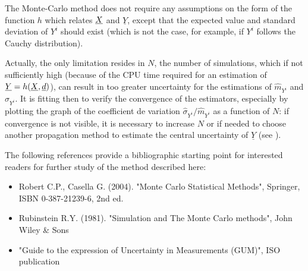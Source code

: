{
  The Monte-Carlo method does not require any assumptions on the form of the function $h$ which relates ${\underline{X}}$ and $\underline{Y}$, except that the expected value and standard deviation of $Y^i$ should exist (which is not the case, for example, if $Y^i$ follows the Cauchy distribution).

  Actually, the only limitation resides in $N$, the number of simulations, which if not sufficiently high (because of the CPU time required for an estimation of $\underline{Y}=h({\underline{X}},{\underline{d}})$), can result in too greater uncertainty for the estimations of  $\widehat{m}_{Y^i}$ and $\widehat{\sigma}_{Y^i}$. It is fitting then to verify the convergence of the estimators, especially by plotting the graph of the coefficient de variation  $\widehat{\sigma}_{Y^i} / \widehat{m}_{Y^i}$ as a function of $N$: if convergence is not visible, it is necessary to increase $N$ or if needed to choose another propagation method to estimate the central uncertainty of $\underline{Y}$ (see ).

  The following references provide a bibliographic starting point for interested readers for further study of the method described here:
  \begin{itemize}
  \item Robert C.P., Casella G. (2004). "Monte Carlo Statistical Methods", Springer, ISBN 0-387-21239-6, 2nd ed.
  \item Rubinstein R.Y. (1981). "Simulation and The Monte Carlo methods", John Wiley \& Sons
  \item "Guide to the expression of Uncertainty in Measurements (GUM)", ISO publication
  \end{itemize}
}
